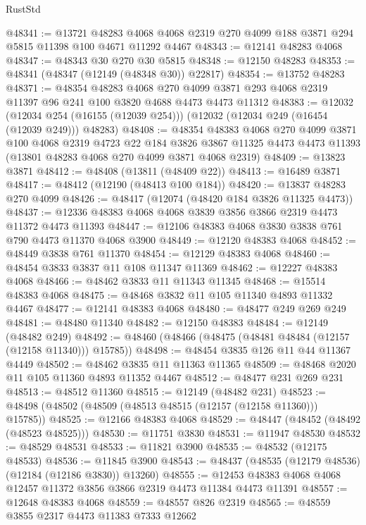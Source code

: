 \begin{lexlean}{RustStd}
\begin{coremodule}
@48341 := @13721
    @48283
    @4068
    @4068
    @2319
    @270
    @4099
    @188
    @3871
    @294
    @5815
    @11398
    @100
    @4671
    @11292
    @4467
@48343 := @12141 @48283 @4068
@48347 := @48343 @30 @270 @30 @5815
@48348 := @12150 @48283
@48353 := @48341 (@48347 (@12149 (@48348 @30)) @22817)
@48354 := @13752 @48283
@48371 := @48354
    @48283
    @4068
    @270
    @4099
    @3871
    @293
    @4068
    @2319
    @11397
    @96
    @241
    @100
    @3820
    @4688
    @4473
    @4473
    @11312
@48383 := @12032
    (@12034 @254 (@16155 (@12039 @254)))
    (@12032 (@12034 @249 (@16454 (@12039 @249))) @48283)
@48408 := @48354
    @48383
    @4068
    @270
    @4099
    @3871
    @100
    @4068
    @2319
    @4723
    @22
    @184
    @3826
    @3867
    @11325
    @4473
    @4473
    @11393
    (@13801 @48283 @4068 @270 @4099 @3871 @4068 @2319)
@48409 := @13823 @3871
@48412 := @48408 (@13811 (@48409 @22))
@48413 := @16489 @3871
@48417 := @48412 (@12190 (@48413 @100 @184))
@48420 := @13837 @48283 @270 @4099
@48426 := @48417 (@12074 (@48420 @184 @3826 @11325 @4473))
@48437 := @12336 @48383 @4068 @4068 @3839 @3856 @3866 @2319 @4473 @11372 @4473 @11393
@48447 := @12106 @48383 @4068 @3830 @3838 @761 @790 @4473 @11370 @4068 @3900
@48449 := @12120 @48383 @4068
@48452 := @48449 @3838 @761 @11370
@48454 := @12129 @48383 @4068
@48460 := @48454 @3833 @3837 @11 @108 @11347 @11369
@48462 := @12227 @48383 @4068
@48466 := @48462 @3833 @11 @11343 @11345
@48468 := @15514 @48383 @4068
@48475 := @48468 @3832 @11 @105 @11340 @4893 @11332 @4467
@48477 := @12141 @48383 @4068
@48480 := @48477 @249 @269 @249
@48481 := @48480 @11340
@48482 := @12150 @48383
@48484 := @12149 (@48482 @249)
@48492 := @48460 (@48466 (@48475 (@48481 @48484 (@12157 (@12158 @11340))) @15785))
@48498 := @48454 @3835 @126 @11 @44 @11367 @4449
@48502 := @48462 @3835 @11 @11363 @11365
@48509 := @48468 @2020 @11 @105 @11360 @4893 @11352 @4467
@48512 := @48477 @231 @269 @231
@48513 := @48512 @11360
@48515 := @12149 (@48482 @231)
@48523 := @48498 (@48502 (@48509 (@48513 @48515 (@12157 (@12158 @11360))) @15785))
@48525 := @12166 @48383 @4068
@48529 := @48447 (@48452 (@48492 (@48523 @48525)))
@48530 := @11751 @3830
@48531 := @11947 @48530
@48532 := @48529 @48531
@48533 := @11821 @3900
@48535 := @48532 (@12175 @48533)
@48536 := @11845 @3900
@48543 := @48437 (@48535 (@12179 @48536) (@12184 (@12186 @3830)) @13260)
@48555 := @12453 @48383 @4068 @4068 @12457 @11372 @3856 @3866 @2319 @4473 @11384 @4473 @11391
@48557 := @12648 @48383 @4068
@48559 := @48557 @826 @2319
@48565 := @48559 @3855 @2317 @4473 @11383 @7333 @12662

\end{coremodule}
\end{lexlean}
